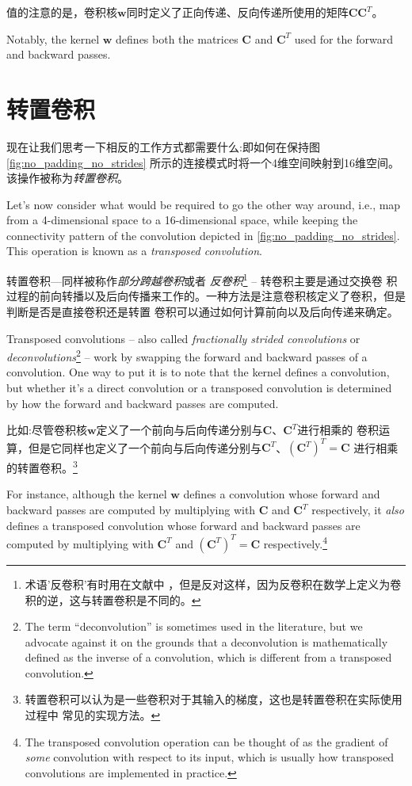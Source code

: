 \documentclass[notitlepage]{report}
\begin{document}
值的注意的是，卷积核$\mathbf{w}$同时定义了正向传递、反向传递所使用的矩阵$\mathbf{C}$$\mathbf{C}^T$。

Notably, the kernel $\mathbf{w}$ defines both the matrices $\mathbf{C}$ and
$\mathbf{C}^T$ used for the forward and backward passes.

\section{转置卷积}

现在让我们思考一下相反的工作方式都需要什么:即如何在保持图\autoref{fig:no_padding_no_strides}
所示的连接模式时将一个4维空间映射到16维空间。该操作被称为{\em 转置卷积}。

Let's now consider what would be required to go the other way around, i.e., map
from a 4-dimensional space to a 16-dimensional space, while keeping the
connectivity pattern of the convolution depicted in
\autoref{fig:no_padding_no_strides}. This operation is known as a {\em
transposed convolution}.

转置卷积---同样被称作{\em 部分跨越卷积\/}或者 {\em 反卷积\/}\footnote{术语'反卷积'有时用在文献中
，但是反对这样，因为反卷积在数学上定义为卷积的逆，这与转置卷积是不同的。} -- 转卷积主要是通过交换卷
积过程的前向转播以及后向传播来工作的。一种方法是注意卷积核定义了卷积，但是判断是否是直接卷积还是转置
卷积可以通过如何计算前向以及后向传递来确定。

Transposed convolutions -- also called {\em fractionally strided convolutions\/}
or {\em deconvolutions\/}\footnote{The term ``deconvolution'' is sometimes used
in the literature, but we advocate against it on the grounds that a
deconvolution is mathematically defined as the inverse of a convolution, which
is different from a transposed convolution.} -- work by swapping the forward and
backward passes of a convolution. One way to put it is to note that the kernel
defines a convolution, but whether it's a direct convolution or a transposed
convolution is determined by how the forward and backward passes are computed.

比如:尽管卷积核$\mathbf{w}$定义了一个前向与后向传递分别与$\mathbf{C}$、$\mathbf{C}^T$进行相乘的
卷积运算，但是它同样也定义了一个前向与后向传递分别与$\mathbf{C}^T$、$(\mathbf{C}^T)^T = \mathbf{C}$
进行相乘的转置卷积。\footnote{转置卷积可以认为是一些卷积对于其输入的梯度，这也是转置卷积在实际使用过程中
常见的实现方法。}

For instance, although the kernel $\mathbf{w}$ defines a convolution whose
forward and backward passes are computed by multiplying with $\mathbf{C}$ and
$\mathbf{C}^T$ respectively, it {\em also\/} defines a transposed convolution
whose forward and backward passes are computed by multiplying with
$\mathbf{C}^T$ and $(\mathbf{C}^T)^T = \mathbf{C}$ respectively.\footnote{The
    transposed convolution operation can be thought of as the gradient of {\em
    some\/} convolution with respect to its input, which is usually how
    transposed convolutions are implemented in practice.}
\end{document}

